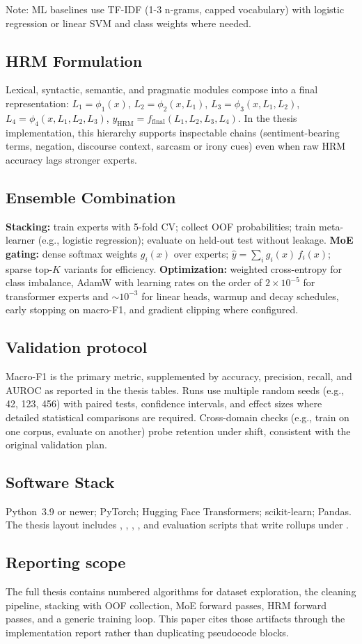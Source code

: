 Note: ML baselines use TF-IDF (1-3 n-grams, capped vocabulary) with logistic regression or linear SVM and class weights where needed.

\subsection{HRM Formulation}
Lexical, syntactic, semantic, and pragmatic modules compose into a final representation:
$L_1 = \phi_1(x)$,
$L_2 = \phi_2(x, L_1)$,
$L_3 = \phi_3(x, L_1, L_2)$,
$L_4 = \phi_4(x, L_1, L_2, L_3)$,
$y_{\mathrm{HRM}} = f_{\mathrm{final}}(L_1, L_2, L_3, L_4)$.
In the thesis implementation, this hierarchy supports inspectable chains (sentiment-bearing terms, negation, discourse context, sarcasm or irony cues) even when raw HRM accuracy lags stronger experts.

\subsection{Ensemble Combination}
\textbf{Stacking:} train experts with 5-fold CV; collect OOF probabilities; train meta-learner (e.g., logistic regression); evaluate on held-out test without leakage.
\textbf{MoE gating:} dense softmax weights $g_i(x)$ over experts; $\hat{y} = \sum_i g_i(x)\, f_i(x)$; sparse top-$K$ variants for efficiency.
\textbf{Optimization:} weighted cross-entropy for class imbalance, AdamW with learning rates on the order of $2\times10^{-5}$ for transformer experts and $\sim\!10^{-3}$ for linear heads, warmup and decay schedules, early stopping on macro-F1, and gradient clipping where configured.

\subsection{Validation protocol}
Macro-F1 is the primary metric, supplemented by accuracy, precision, recall, and AUROC as reported in the thesis tables. Runs use multiple random seeds (e.g., 42, 123, 456) with paired tests, confidence intervals, and effect sizes where detailed statistical comparisons are required. Cross-domain checks (e.g., train on one corpus, evaluate on another) probe retention under shift, consistent with the original validation plan.

\subsection{Software Stack}
Python~3.9 or newer; PyTorch; Hugging Face Transformers; scikit-learn; Pandas. The thesis layout includes , , , , and evaluation scripts that write rollups under .

\subsection{Reporting scope}
The full thesis contains numbered algorithms for dataset exploration, the cleaning pipeline, stacking with OOF collection, MoE forward passes, HRM forward passes, and a generic training loop. This paper cites those artifacts through the implementation report rather than duplicating pseudocode blocks.

